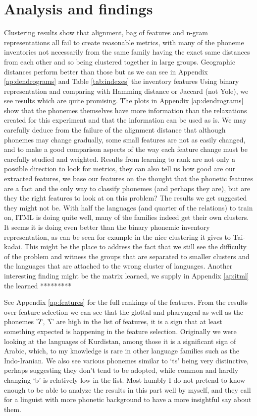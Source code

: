 \documentclass[letterpaper, 11pt]{article}
\begin{document}
\section{Analysis and findings}
Clustering results show that alignment, bag of features and n-gram representations all fail to create reasonable metrics, with many of the phoneme inventories not necessarily from the same family having the exact same distances from each other and so being clustered together in large groups. Geographic distances perform better than those but as we can see in Appendix \ref{ap:dendrograms} and Table \ref{tab:indexes} the inventory features  Using binary representation and comparing with Hamming distance or Jaccard (not Yole), we see results which are quite promising. The plots in Appendix \ref{ap:dendrograms} show that the phonemes themselves have more information than the relaxations created for this experiment and that the information can be used as is.
We may carefully deduce from the failure of the alignment distance that although phonemes may change gradually, some small features are not as easily changed, and to make a good comparison aspects of the way each feature change must be carefully studied and weighted.
Results from learning to rank are not only a possible direction to look for metrics, they can also tell us how good are our extracted features, we base our features on the thought that the phonetic features are a fact and the only way to classify phonemes (and perhaps they are), but are they the right features to look at on this problem? The results we get suggested they might not be. With half the languages (and quarter of the relations) to train on, ITML is doing quite well, many of the families indeed get their own clusters. It seems it is doing even better than the binary phonemic inventory representation, as can be seen for example in the nice clustering it gives to Tai-kadai. 
This might be the place to address the fact that we still see the difficulty of the problem and witness the groups that are separated to smaller clusters and the languages that are attached to the wrong cluster of languages. Another interesting finding might be the matrix learned, we supply in Appendix \ref{ap:itml} the learned *********
\label{tab:indexes}

See Appendix \ref{ap:features} for the full rankings of the features. From the results over feature selection we can see that the glottal and pharyngeal as well as the phonemes 'ʔ', 'ʕ' are high in the list of features, it is a sign that at least something expected is happening in the feature selection. Originally we were looking at the languages of Kurdistan, among those it is a significant sign of Arabic, which, to my knowledge is rare in other language families such as the Indo-Iranian. We also see various phonemes similar to ‘ts’ being very distinctive, perhaps suggesting they don’t tend to be adopted, while common and hardly changing ‘b’ is relatively low in the list.
Most humbly I do not pretend to know enough to be able to analyze the results in this part well by myself, and they call for a linguist with more phonetic background to have a more insightful say about them.
\end{document}
